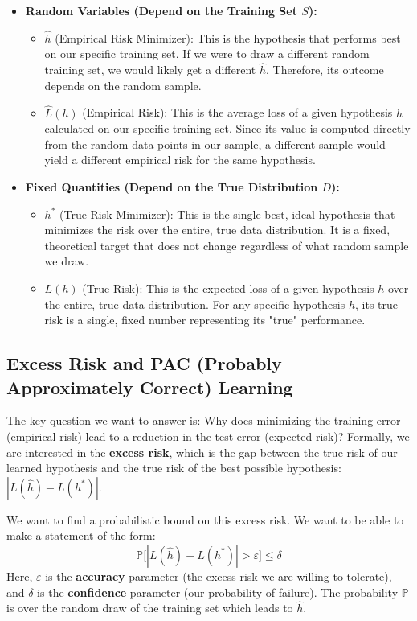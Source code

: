 \documentclass[11pt]{article}
\theoremstyle{plain} %
\begin{document}
\begin{itemize}
    \item \textbf{Random Variables (Depend on the Training Set $S$):}
    \begin{itemize}
        \item $\hat{h}$ (Empirical Risk Minimizer): This is the hypothesis that performs best on our specific training set. If we were to draw a different random training set, we would likely get a different $\hat{h}$. Therefore, its outcome depends on the random sample.
        \item $\hat{L}(h)$ (Empirical Risk): This is the average loss of a given hypothesis $h$ calculated on our specific training set. Since its value is computed directly from the random data points in our sample, a different sample would yield a different empirical risk for the same hypothesis.
    \end{itemize}
    \item \textbf{Fixed Quantities (Depend on the True Distribution $D$):}
    \begin{itemize}
        \item $h^*$ (True Risk Minimizer): This is the single best, ideal hypothesis that minimizes the risk over the entire, true data distribution. It is a fixed, theoretical target that does not change regardless of what random sample we draw.
        \item $L(h)$ (True Risk): This is the expected loss of a given hypothesis $h$ over the entire, true data distribution. For any specific hypothesis $h$, its true risk is a single, fixed number representing its "true" performance.
    \end{itemize}
\end{itemize}

\subsection{Excess Risk and PAC (Probably Approximately Correct) Learning}
The key question we want to answer is: Why does minimizing the training error (empirical risk) lead to a reduction in the test error (expected risk)? Formally, we are interested in the \textbf{excess risk}, which is the gap between the true risk of our learned hypothesis and the true risk of the best possible hypothesis: $|L(\hat{h}) - L(h^*)|$.

We want to find a probabilistic bound on this excess risk. We want to be able to make a statement of the form:
\[ \mathbb{P}\bigl[|L(\hat{h}) - L(h^*)| > \varepsilon\bigr] \leq \delta \]
Here, $\varepsilon$ is the \textbf{accuracy} parameter (the excess risk we are willing to tolerate), and $\delta$ is the \textbf{confidence} parameter (our probability of failure). The probability $\mathbb{P}$ is over the random draw of the training set which leads to $\hat{h}$.
\end{document}
